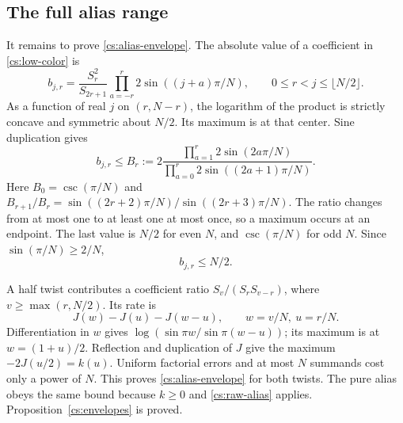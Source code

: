 \subsection{The full alias range}
It remains to prove \eqref{cs:alias-envelope}. The absolute value of a coefficient in \eqref{cs:low-color} is
\[
 b_{j,r}=\frac{S_r^2}{S_{2r+1}}
 \prod_{a=-r}^r2\sin((j+a)\pi/N),\qquad
 0\le r<j\le\lfloor N/2\rfloor.
\]
As a function of real $j$ on $(r,N-r)$, the logarithm of the product is strictly concave and symmetric about $N/2$. Its maximum is at that center. Sine duplication gives
\[
 b_{j,r}\le B_r:=
 2\frac{\prod_{a=1}^r2\sin(2a\pi/N)}
 {\prod_{a=0}^r2\sin((2a+1)\pi/N)}.
\]
Here $B_0=\csc(\pi/N)$ and
$B_{r+1}/B_r=\sin((2r+2)\pi/N)/\sin((2r+3)\pi/N)$.
The ratio changes from at most one to at least one at most once, so a maximum occurs at an endpoint. The last value is $N/2$ for even $N$, and $\csc(\pi/N)$ for odd $N$. Since $\sin(\pi/N)\ge2/N$,
\begin{equation}\label{cs:raw-alias}
 b_{j,r}\le N/2.
\end{equation}

A half twist contributes a coefficient ratio $S_v/(S_rS_{v-r})$, where $v\ge\max(r,N/2)$. Its rate is
\[
 J(w)-J(u)-J(w-u),\qquad w=v/N,\ u=r/N.
\]
Differentiation in $w$ gives
$\log(\sin\pi w/\sin\pi(w-u))$; its maximum is at $w=(1+u)/2$. Reflection and duplication of $J$ give the maximum $-2J(u/2)=k(u)$. Uniform factorial errors and at most $N$ summands cost only a power of $N$. This proves \eqref{cs:alias-envelope} for both twists. The pure alias obeys the same bound because $k\ge0$ and \eqref{cs:raw-alias} applies. Proposition~\ref{cs:envelopes} is proved.
